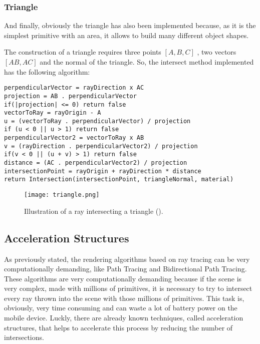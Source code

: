 \subsubsection{Triangle}

\par
And finally, obviously the triangle has also been implemented because, as it is the simplest primitive with an area, it allows to build many different object shapes.

\par
The construction of a triangle requires three points
$[A, B, C]$
, two vectors
$[AB, AC]$
and the normal of the triangle.
So, the intersect method implemented has the following algorithm:

\begin{lstlisting}
perpendicularVector = rayDirection x AC
projection = AB . perpendicularVector
if(|projection| <= 0) return false
vectorToRay = rayOrigin - A
u = (vectorToRay . perpendicularVector) / projection
if (u < 0 || u > 1) return false
perpendicularVector2 = vectorToRay x AB
v = (rayDirection . perpendicularVector2) / projection
if(v < 0 || (u + v) > 1) return false
distance = (AC . perpendicularVector2) / projection
intersectionPoint = rayOrigin + rayDirection * distance
return Intersection(intersectionPoint, triangleNormal, material)
\end{lstlisting}

\begin{figure}[H]
	\centering
	\caption{Illustration of a ray intersecting a triangle (\cite{TriangleRayIntersection}).}
	\label{Sphere.}
	\texttt{[image: triangle.png]}
\end{figure}

\subsection{Acceleration Structures}

\par
As previously stated, the rendering algorithms based on ray tracing can be very computationally demanding, like Path Tracing and Bidirectional Path Tracing.
These algorithms are very computationally demanding because if the scene is very complex, made with millions of primitives, it is necessary to try to intersect every ray thrown into the scene with those millions of primitives.
This task is, obviously, very time consuming and can waste a lot of battery power on the mobile device.
Luckly, there are already known techniques, called acceleration structures, that helps to accelerate this process by reducing the number of intersections.


